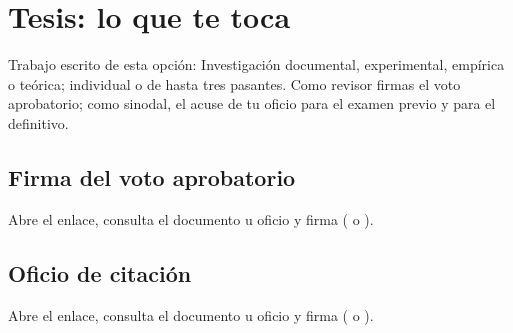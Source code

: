 \section{Tesis: lo que te toca}
Trabajo escrito de esta opción: Investigación documental, experimental, empírica o teórica; individual o de hasta tres pasantes. Como revisor firmas el voto aprobatorio; como sinodal, el acuse de tu oficio para el examen previo y para el definitivo.
\subsection{Firma del voto aprobatorio}
Abre el enlace, consulta el documento u oficio y firma ( o ).
\subsection{Oficio de citación}
Abre el enlace, consulta el documento u oficio y firma ( o ).

